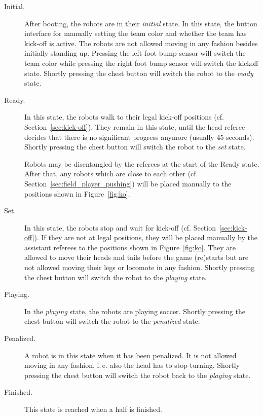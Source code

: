 \documentclass[12pt]{article}
\newcommand{\ie}{\mbox{i.\,e.}\xspace}
\newcommand{\eg}{\mbox{e.\,g.}\xspace}
\newcommand{\cf}{\mbox{cf.}\xspace}
\begin{document}
\begin{description}

\item[Initial.] After booting, the robots are in their \emph{initial} state. In this state, the button interface for manually setting the team color and whether the team has kick-off is active. The robots are not allowed moving in any fashion besides initially standing up. Pressing the left foot bump sensor will switch the team color while pressing the right foot bump sensor will switch the kickoff state. Shortly pressing the chest button will switch the robot to the \emph{ready} state.



\item[Ready.] In this state, the robots walk to their legal kick-off positions (\cf Section~\ref{sec:kick-off}). They remain in this state, until the head referee decides that there is no significant progress anymore (usually 45 seconds). Shortly pressing the chest button will switch the robot to the \emph{set} state.%

Robots may be disentangled by the referees at the start of the Ready state.  After that, any robots which are close to each other (\cf Section~\ref{sec:field_player_pushing}) will be placed manually to the positions shown in Figure~\ref{fig:ko}.

\item[Set.] In this state, the robots stop and wait for kick-off (\cf Section~\ref{sec:kick-off}). If they are not at legal positions, they will be placed manually by the assistant referees to the positions shown in Figure~\ref{fig:ko}. They are allowed to move their heads and tails before the game (re)starts but are not allowed moving their legs or locomote in any fashion. Shortly pressing the chest button will switch the robot to the \emph{playing} state.


\item[Playing.] In the \emph{playing} state, the robots are playing soccer. Shortly pressing the chest button will switch the robot to the \emph{penalized} state.%
\item[Penalized.] A robot is in this state when it has been penalized. It is not allowed moving in any fashion, \ie also the head has to stop turning. Shortly pressing the chest button will switch the robot back to the \emph{playing} state.
\item[Finished.] This state is reached when a half is finished.
\end{description}
\end{document}
